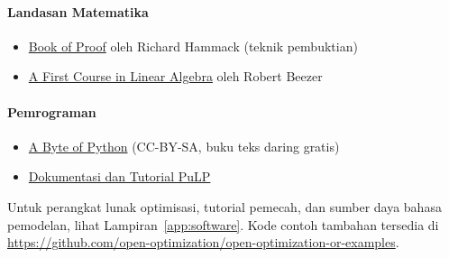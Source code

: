 \paragraph{\textbf{Landasan Matematika}}
\begin{itemize}
\item \href{https://open.umn.edu/opentextbooks/textbooks/book-of-proof}{Book of Proof} oleh Richard Hammack (teknik pembuktian)
\item \href{http://linear.ups.edu/html/fcla.html}{A First Course in Linear Algebra} oleh Robert Beezer
\end{itemize}

\paragraph{\textbf{Pemrograman}}
\begin{itemize}
\item \href{https://open.umn.edu/opentextbooks/textbooks/a-byte-of-python}{A Byte of Python} (CC-BY-SA, buku teks daring gratis)
\item \href{https://coin-or.github.io/pulp/}{Dokumentasi dan Tutorial PuLP}
\end{itemize}

\noindent Untuk perangkat lunak optimisasi, tutorial pemecah, dan sumber daya bahasa pemodelan, lihat Lampiran~\ref{app:software}. Kode contoh tambahan tersedia di \url{https://github.com/open-optimization/open-optimization-or-examples}.
